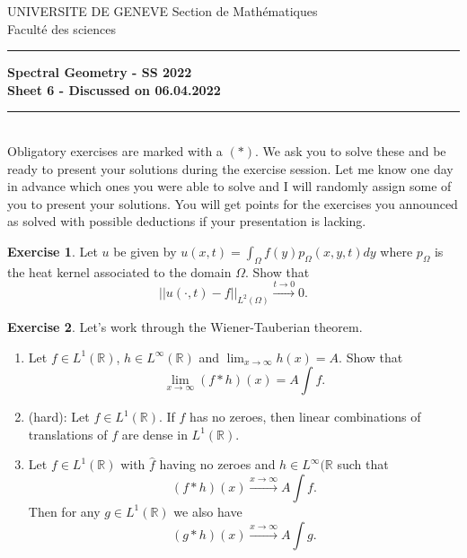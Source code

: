\documentclass[a4paper,11pt]{article}
\theoremstyle{definition}
\newtheorem{exercise}{Exercise}
\begin{document}
\pagestyle{headings}
\noindent UNIVERSITE DE GENEVE \hfill Section de Mathématiques\\
\noindent Facult\'e des sciences \hfill \\[-3mm]
\hrule

\large

\begin{center}
\textbf{Spectral Geometry - SS 2022 \\ Sheet 6 - Discussed on 06.04.2022}
\end{center}
\hrule
\text{}\\[1cm]

Obligatory exercises are marked with a $(*)$. We ask you to solve these and be ready to present your solutions during the exercise session. Let me know one day in advance which ones you were able to solve and I will randomly assign some of you to present your solutions. You will get points for the exercises you announced as solved with possible deductions if your presentation is lacking.

\begin{exercise}
	Let $u$ be given by $u(x,t) = \int_\Omega f(y) p_\Omega(x,y,t) dy$ where $p_\Omega$ is the heat kernel associated to the domain $\Omega$. Show that
	\[ ||u(\cdot,t) - f||_{L^2(\Omega)} \xrightarrow{t\to 0} 0. \]
\end{exercise}

\begin{exercise}
	Let's work through the Wiener-Tauberian theorem.
	\begin{enumerate}
		\item Let $f \in L^1(\mathbb{R})$, $h \in L^\infty(\mathbb{R})$ and $\lim_{x \to \infty} h(x) = A$. Show that
		\[ \lim_{x \to \infty} (f * h)(x) = A \int f. \] 

		\item (hard): Let $f \in L^1(\mathbb{R})$. If $\hat{f}$ has no zeroes, then linear combinations of translations of $f$ are dense in $L^1(\mathbb{R})$.
		\item Let $f \in L^1(\mathbb{R})$ with $\hat{f}$ having no zeroes and $h \in L^\infty(\mathbb{R}$ such that
		\[ (f * h)(x) \xrightarrow{x \to \infty} A \int f. \]
		Then for any $ g \in L^1(\mathbb{R})$ we also have
		\[ (g * h)(x) \xrightarrow{x \to \infty} A \int g. \]
	\end{enumerate}
\end{exercise}
\end{document}
